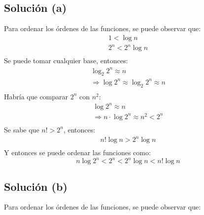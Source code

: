 \subsection{Solución (a)}
Para ordenar los órdenes de las funciones, se puede observar que:
\begin{align*}
    1 < \log n \\
    2^n < 2^n \log n \\
\end{align*}
Se puede tomar cualquier base, entonces:
\begin{align*}
    \log_2 2^n \approx n \\
    \Rightarrow \log 2^n \approx \log_2 2^n \approx n \\
\end{align*}
Habría que comparar $2^n$ con $n^2$:
\begin{align*}
    \log 2^n \approx n \\
    \Rightarrow n \cdot \log 2^n \approx n^2 < 2^n \\
\end{align*}
Se sabe que $n! > 2^n$, entonces:
\begin{align*}
    n! \log n > 2^n \log n \\
\end{align*}
Y entonces se puede ordenar las funciones como:
\begin{equation*}
    n \log 2^n < 2^n < 2^n \log n < n! \log n 
\end{equation*}

\subsection{Solución (b)}
Para ordenar los órdenes de las funciones, se puede observar que: